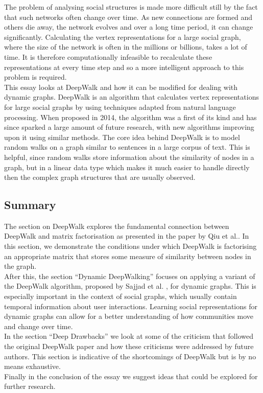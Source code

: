 \documentclass[a4paper]{article}
\begin{document}
The problem of analysing social structures is made more difficult still by the
fact that such networks often change over time. As new connections are formed
and others die away, the network evolves and over a long time period, it can
change significantly. Calculating the vertex representations for a large social
graph, where the size of the network is often in the millions or billions, takes
a lot of time. It is therefore computationally infeasible to recalculate these
representations at every time step and so a more intelligent approach to this
problem is required.\\
This essay looks at DeepWalk\cite{deepwalk} and how it can be modified for dealing with dynamic
graphs. DeepWalk is an algorithm that calculates vertex representations for
large social graphs by using techniques adapted from natural language processing. When proposed in 2014,
 the algorithm was a first of its kind and has since sparked a large amount of future research, with new
algorithms improving upon it using similar methods. The core idea behind DeepWalk is to model random walks
on a graph similar to sentences in a large corpus of text. This is helpful, since random walks store information
about the similarity of nodes in a graph, but in a linear data type which makes it much easier to handle directly then the
complex graph structures that are usually observed.


\subsection{Summary}
The section on DeepWalk explores the fundamental connection between DeepWalk and
matrix factorisation as presented in the paper by Qiu et al.\cite{qiu2018}. In
this section, we demonstrate the conditions under which DeepWalk is factorising
an appropriate matrix that stores some measure of similarity between
nodes in the graph.\\
After this, the section ``Dynamic DeepWalking'' focuses on applying a variant of the DeepWalk algorithm, proposed
by Sajjad et al. \cite{sajjad2019}, for dynamic graphs. This is especially
important in the context of social graphs, which usually contain temporal information
about user interactions. Learning social
representations for dynamic graphs can allow for a better understanding of how
communities move and change over time.\\
In the section ``Deep Drawbacks'' we look at some of the
criticism that followed the original DeepWalk paper and how these criticisms
were addressed by future authors. This section is indicative of the shortcomings
of DeepWalk but is by no means exhaustive.\\
Finally in the conclusion of the essay we suggest ideas that could be explored for further research.
\end{document}
